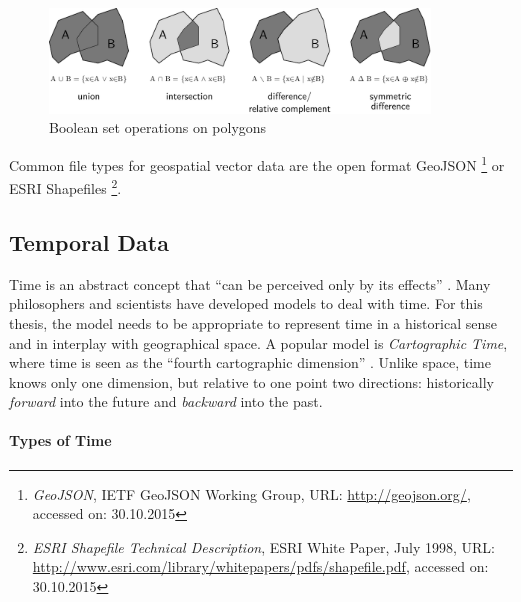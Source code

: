 \begin{figure}[ht]
  \centering
  \includegraphics[width=0.9\textwidth]{graphics/basics/hgis/polygon_operations}
  \caption{Boolean set operations on polygons}
  \label{fig:polygon_operations}
\end{figure}

Common file types for geospatial vector data are the open format GeoJSON
\footnote{
  \emph{GeoJSON},
  IETF GeoJSON Working Group,
  URL: \url{http://geojson.org/},
  accessed on: 30.10.2015
}
or ESRI Shapefiles
\footnote{
  \emph{ESRI Shapefile Technical Description},
  ESRI White Paper, July 1998,
  URL: \url{http://www.esri.com/library/whitepapers/pdfs/shapefile.pdf},
  accessed on: 30.10.2015
}.



\subsection{Temporal Data} %
\label{sub:temporal_data}

Time is an abstract concept that ``can be perceived only by its effects''
\cite[p. 27]{Langran1989timeingis}.
Many philosophers and scientists have developed models to deal with time. For this thesis, the model needs to be appropriate to represent time in a historical sense and in interplay with geographical space. A popular model is \emph{Cartographic Time}, where time is seen as the ``fourth cartographic dimension''
\cite[p. 28]{Langran1989timeingis}.
Unlike space, time knows only one dimension, but relative to one point two directions: historically \emph{forward} into the future and \emph{backward} into the past.

\paragraph{Types of Time} %
\label{par:types_of_time}

